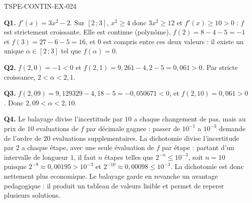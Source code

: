 \begin{corrige}{TSPE-CONTIN-EX-024}

\textbf{Q1.} $f'(x) = 3x^2 - 2$. Sur $[2\,;3]$, $x^2 \geq 4$ donc $3x^2 \geq 12$ et $f'(x) \geq 10 > 0$ : $f$ est strictement croissante. Elle est continue (polynôme), $f(2) = 8 - 4 - 5 = -1$ et $f(3) = 27 - 6 - 5 = 16$, et $0$ est compris entre ces deux valeurs : il existe un unique $\alpha \in [2\,;3]$ tel que $f(\alpha) = 0$.

\textbf{Q2.} $f(2{,}0) = -1 < 0$ et $f(2{,}1) = 9{,}261 - 4{,}2 - 5 = 0{,}061 > 0$. Par stricte croissance, $2 < \alpha < 2{,}1$.

\textbf{Q3.} $f(2{,}09) = 9{,}129329 - 4{,}18 - 5 = -0{,}050671 < 0$, et $f(2{,}10) = 0{,}061 > 0$. Donc $2{,}09 < \alpha < 2{,}10$.

\textbf{Q4.} Le balayage divise l'incertitude par $10$ a chaque changement de pas, mais au prix de $10$ evaluations de $f$ par décimale gagnee : passer de $10^{-1}$ a $10^{-3}$ demande de l'ordre de $20$ evaluations supplementaires. La dichotomie divise l'incertitude par $2$ a chaque étape, avec une seule évaluation de $f$ par étape : partant d'un intervalle de longueur $1$, il faut $n$ étapes telles que $2^{-n} \leq 10^{-3}$, soit $n = 10$ puisque $2^{-9} \approx 0{,}00195 > 10^{-3}$ et $2^{-10} \approx 0{,}00098 \leq 10^{-3}$. La dichotomie est donc nettement plus economique. Le balayage garde en revanche un avantage pedagogique : il produit un tableau de valeurs lisible et permet de reperer plusieurs solutions.
\end{corrige}
